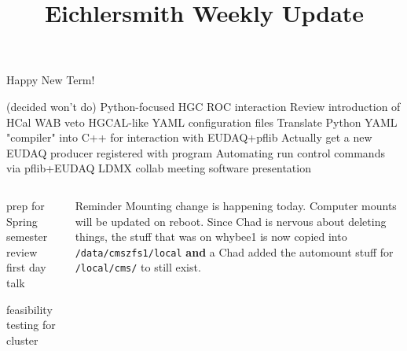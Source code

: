 \documentclass[aspectratio=169]{beamer}
\title[Weekly Update]{Eichlersmith Weekly Update}
\begin{document}
\begin{frame}{Happy New Term!}{}

  \begin{itemize}
    \done (decided won't do) Python-focused HGC ROC interaction
    \done Review introduction of HCal WAB veto
    \done HGCAL-like YAML configuration files
    \todo Translate Python YAML "compiler" into C++ for interaction with EUDAQ+pflib
    \todo Actually get a new EUDAQ producer registered with program
    \todo Automating run control commands via pflib+EUDAQ
    \todo LDMX collab meeting software presentation
  \end{itemize}

  \begin{columns}
    \begin{column}{0.5\textwidth}
  \begin{itemize}
    \done prep for Spring semester
    \todo review first day talk
  \end{itemize}

  \begin{itemize}
    \todo feasibility testing for cluster
  \end{itemize}
\end{column}
\begin{column}{0.5\textwidth}
  \begin{block}{Reminder}
    \tiny
    Mounting change is happening today. Computer mounts will be updated on reboot.
    Since Chad is nervous about deleting things, the stuff that was on whybee1 is 
    now copied into \texttt{/data/cmszfs1/local} \textbf{and} a Chad added the automount
    stuff for \texttt{/local/cms/} to still exist.
  \end{block}
\end{column}
\end{columns}
\end{frame}
\end{document}
